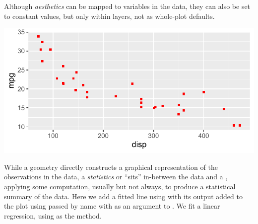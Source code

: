 \documentclass[krantz2]{krantz}\usepackage{knitr}
\begin{document}
Although \emph{aesthetics} can be mapped to variables in the data, they can also be set to constant values, but only within layers, not as whole-plot defaults.

\begin{knitrout}\footnotesize
{}\color{fgcolor}\begin{kframe}
\begin{alltt}
\hlstd{(} 
       \hlstd{(}    \hlopt{+}
  \hlstd{(} \hlstd{=} \hlstd{,}  \hlstd{=} \hlstd{)}
\end{alltt}
\end{kframe}

{\centering \includegraphics[width=.7\textwidth]{figure/pos-ggplot-basics-04a-1} 

}


\end{knitrout}

While a geometry directly constructs a graphical representation of the observations in the data, a \emph{statistics} or  ``sits'' in-between the data and a , applying some computation, usually but not always, to produce a statistical summary of the data. Here we add a fitted line using  with its output added to the plot using  passed by name with  as an argument to . We fit a linear regression, using  as the method.
\end{document}
